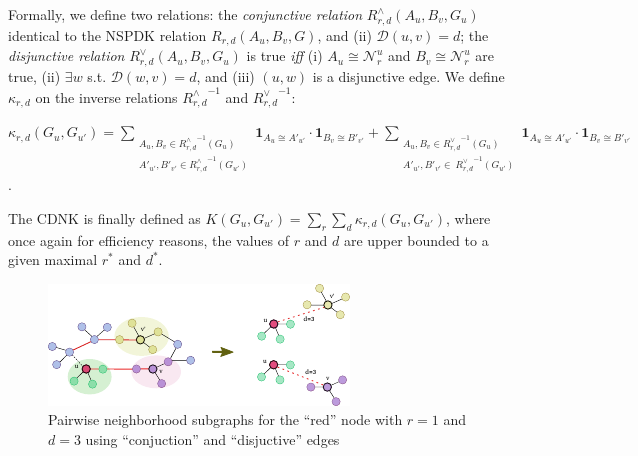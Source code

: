 Formally, we define two relations: the \textit{conjunctive relation} $R^{\wedge}_{r,d}(A_u, B_v, G_u)$ identical to the NSPDK relation $R_{r,d}(A_u, B_v, G)$,  and (ii) $\mathcal{D}(u,v)= d$; the \textit{disjunctive relation} $R_{r,d}^{\vee}(A_u, B_v, G_u)$ is true {\em iff} (i)  $A_u \cong \mathcal{N}_r^u$ and $B_v \cong \mathcal{N}_r^u$ are true, (ii) $\exists w$ s.t. $\mathcal{D}(w,v)= d$, and (iii) $(u,w)$ is a disjunctive edge. We define $\kappa_{r,d}$ on the  inverse relations ${R^{\wedge}_{r,d}}^{ -1}$ and ${R^{\vee}_{r,d}}^{ -1}$:
\begin{center}
 $\kappa_{r,d}(G_u,G_{u'}) = \!\!\!\!\!\!\!\!\!\!\!\!
 \sum\limits_{\substack {A_u,{B}_{v} \in {R_{r,d}^{\wedge}}^{ -1}(G_u) \\ A'_{u'},{B'}_{v'} \in {R_{r,d}^{\wedge}}^{ -1}(G_{u'}) }} \!\!\!\!\!\!\!\!\!\!\!\!
  { \textbf{1}_{A_u \cong A'_{u'}} \cdot { \textbf{1}_{B_{v} \cong B'_{v'}}}}
+ \!\!\!\!\!\!\!\!\!\!\!\!
 \sum\limits_{\substack {A_u,{B}_{v} \in {R_{r,d}^{\vee}}^{ -1}(G_u) \\
  A'_{u'},{B'}_{v'} \in \ {R_{r,d}^{\vee}}^{ -1}(G_{u'}) }} \!\!\!\!\!\!\!\!\!\!\!\!
  { \textbf{1}_{A_u \cong A'_{u'}} \cdot { \textbf{1}_{B_{v} \cong B'_{v'}}}}
  $.
\end{center}
The CDNK is finally defined as $K(G_u,G_{u'}) = \sum\limits_{r}{\sum\limits_{d}{\kappa_{r,d}(G_u,G_{u'})}}$, where once again for efficiency reasons, the values of $r$ and $d$ are upper bounded to a given maximal $r^*$ and $d^*$.

\begin{figure}
\centering
\includegraphics[width=.9\textwidth]{img/cdnk}
\caption{Pairwise neighborhood subgraphs for the ``red'' node with $r=1$ and $d=3$ using ``conjuction'' and ``disjuctive'' edges}
\label{fig:cdnk}
\end{figure}

